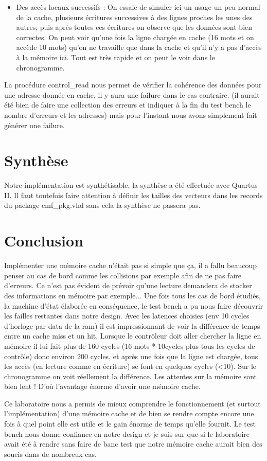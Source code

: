\documentclass[10pt,a4paper]{article}
\begin{document}
\begin{itemize}
\item Des accès locaux successifs :
On essaie de simuler ici un usage un peu normal de la cache, plusieurs écritures successives à des lignes proches les unes des autres, puis après toutes ces écritures on observe que les données sont bien correctes. On peut voir qu'une fois la ligne chargée en cache (16 mots et on accède 10 mots) qu'on ne travaille que dans la cache et qu'il n'y a pas d'accès à la mémoire ici. Tout est très rapide et on peut le voir dans le chronogramme.\\
\end{itemize}

La procédure control\_read nous permet de vérifier la cohérence des données pour une adresse donnée en cache, il y aura une failure dans le cas contraire. (il aurait été bien de faire une collection des erreurs et indiquer à la fin du test bench le nombre d'erreurs et les adresses) mais pour l'instant nous avons simplement fait générer une failure.

\section{Synthèse}
Notre implémentation est synthétisable, la synthèse a été effectuée avec Quartus II. Il faut toutefois faire attention à définir les tailles des vecteurs dans les records du package cmf\_pkg.vhd sans cela la synthèse ne passera pas.

\section{Conclusion}
Implémenter une mémoire cache n'était pas si simple que ça, il a fallu beaucoup penser au cas de bord comme les collisions par exemple afin de ne pas faire d'erreurs. Ce n'est pas évident de prévoir qu'une lecture demandera de stocker des informations en mémoire par exemple... Une fois tous les cas de bord étudiés, la machine d'état élaborée en conséquence, le test bench a pu nous faire découvrir les failles restantes dans notre design. Avec les latences choisies (env 10 cycles d'horloge par data de la ram) il est impressionnant de voir la différence de temps entre un cache miss et un hit. Lorsque le contrôleur doit aller chercher la ligne en mémoire il lui fait plus de 160 cycles (16 mots * 10cycles plus tous les cycles de contrôle) donc environ 200 cycles, et après une fois que la ligne est chargée, tous les accès (en lecture comme en écriture) se font en quelques cycles (<10). Sur le chronogramme on voit réellement la différence. Les attentes sur la mémoire sont bien lent ! D'où l'avantage énorme d'avoir une mémoire cache.

Ce laboratoire nous a permis de mieux comprendre le fonctionnement (et surtout l'implémentation) d'une mémoire cache et de bien se rendre compte encore une fois à quel point elle est utile et le gain énorme de temps qu'elle fournit. Le test bench nous donne confiance en notre design et je suis sur que si le laboratoire avait été à rendre sans faire de banc test que notre mémoire cache aurait bien des soucis dans de nombreux cas.
\end{document}

